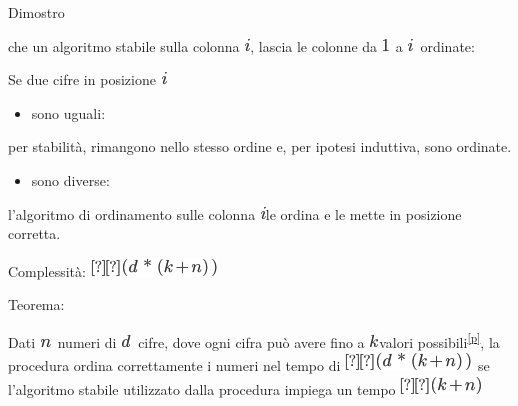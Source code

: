 \documentclass{article}
\providecommand{\tightlist}{%
  \setlength{\itemsep}{0pt}\setlength{\parskip}{0pt}}
\begin{document}
{Dimostro }

{che un algoritmo stabile sulla colonna
}\includegraphics{images/image102.png}{, lascia le colonne da
}\includegraphics{images/image194.png}{~a
}\includegraphics{images/image102.png}{~ordinate:}

{}

{Se due cifre in posizione }\includegraphics{images/image102.png}{~}

\begin{itemize}
\tightlist
\item
  {sono }{uguali}{: }
\end{itemize}

{per stabilità, rimangono nello stesso ordine e, per ipotesi induttiva,
sono ordinate.}

\begin{itemize}
\tightlist
\item
  {sono }{diverse}{:}
\end{itemize}

{l'algoritmo di ordinamento sulle colonna
}\includegraphics{images/image102.png}{le ordina e le mette in posizione
corretta.}

{}

{Complessità: }\includegraphics{images/image196.png}

{}

{Teorema}{: }

{Dati }\includegraphics{images/image41.png}{~numeri di
}\includegraphics{images/image197.png}{~cifre, }{dove ogni cifra può
avere fino a }\includegraphics{images/image118.png}{valori
possibili}\textsuperscript{\protect\hyperlink{cmnt16}{{[}p{]}}}{, la
procedura ordina correttamente i numeri nel tempo di
}\includegraphics{images/image196.png}{~se l'algoritmo stabile
utilizzato dalla procedura impiega un tempo
}\includegraphics{images/image198.png}
\end{document}
